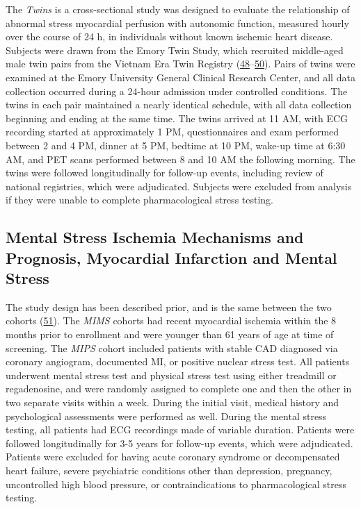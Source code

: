 \documentclass[
  11pt,
  openany]{book}
\begin{document}
The \emph{Twins} is a cross-sectional study was designed to evaluate the relationship of abnormal stress myocardial perfusion with autonomic function, measured hourly over the course of 24 h, in individuals without known ischemic heart disease.
Subjects were drawn from the Emory Twin Study, which recruited middle-aged male twin pairs from the Vietnam Era Twin Registry (\protect\hyperlink{ref-Shah2013}{48}--\protect\hyperlink{ref-Goldberg2002}{50}).
Pairs of twins were examined at the Emory University General Clinical Research Center, and all data collection occurred during a 24-hour admission under controlled conditions.
The twins in each pair maintained a nearly identical schedule, with all data collection beginning and ending at the same time.
The twins arrived at 11 AM, with ECG recording started at approximately 1 PM, questionnaires and exam performed between 2 and 4 PM, dinner at 5 PM, bedtime at 10 PM, wake-up time at 6:30 AM, and PET scans performed between 8 and 10 AM the following morning.
The twins were followed longitudinally for follow-up events, including review of national registries, which were adjudicated.
Subjects were excluded from analysis if they were unable to complete pharmacological stress testing.

\hypertarget{mental-stress-ischemia-mechanisms-and-prognosis-myocardial-infarction-and-mental-stress}{%
\subsection{Mental Stress Ischemia Mechanisms and Prognosis, Myocardial Infarction and Mental Stress}\label{mental-stress-ischemia-mechanisms-and-prognosis-myocardial-infarction-and-mental-stress}}

The study design has been described prior, and is the same between the two cohorts (\protect\hyperlink{ref-Hammadah2017a}{51}).
The \emph{MIMS} cohorts had recent myocardial ischemia within the 8 months prior to enrollment and were younger than 61 years of age at time of screening.
The \emph{MIPS} cohort included patients with stable CAD diagnosed via coronary angiogram, documented MI, or positive nuclear stress test.
All patients underwent mental stress test and physical stress test using either treadmill or regadenosine, and were randomly assigned to complete one and then the other in two separate visits within a week.
During the initial visit, medical history and psychological assessments were performed as well.
During the mental stress testing, all patients had ECG recordings made of variable duration.
Patients were followed longitudinally for 3-5 years for follow-up events, which were adjudicated.
Patients were excluded for having acute coronary syndrome or decompensated heart failure, severe psychiatric conditions other than depression, pregnancy, uncontrolled high blood pressure, or contraindications to pharmacological stress testing.
\end{document}
